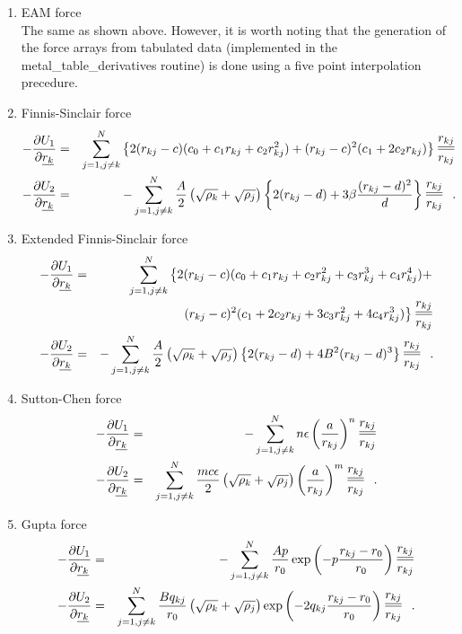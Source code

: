 \begin{enumerate}
\item EAM force \\
The same as shown above.  However, it is worth noting that the
generation of the force arrays from tabulated data (implemented
in the {\sc metal\_table\_derivatives} routine) is done using a
five point interpolation precedure.
\item Finnis-Sinclair force
\begin{eqnarray}
-\frac{\partial U_{1}}{\partial \mbox{$\underline{r_{k}}$}} &=& \sum_{j=1,j \ne k}^{N} \left\{
2 (r_{kj}-c) (c_{0}+c_{1}r_{kj}+c_{2}r_{kj}^{2}) +
(r_{kj}-c)^{2} (c_{1}+2c_{2}r_{kj}) \right\} \frac{\mbox{$\underline{r_{kj}}$}}{r_{kj}} \nonumber \\
-\frac{\partial U_{2}}{\partial \mbox{$\underline{r_{k}}$}} &=& -\sum_{j=1,j \ne k}^{N}
{A \over 2} \left( \sqrt{\rho_{k}} + \sqrt{\rho_{j}} \right)
\left\{ 2(r_{kj}-d) + 3 \beta \frac{(r_{kj}-d)^{2}}{d} \right\} \frac{\mbox{$\underline{r_{kj}}$}}{r_{kj}}~~.
\end{eqnarray}
\item Extended Finnis-Sinclair force
\begin{eqnarray}
-\frac{\partial U_{1}}{\partial \mbox{$\underline{r_{k}}$}} &=& \sum_{j=1,j \ne k}^{N} \left\{
2 (r_{kj}-c) (c_{0}+c_{1}r_{kj}+c_{2}r_{kj}^{2}+c_{3}r_{kj}^{3}+c_{4}r_{kj}^{4}) + \right. \nonumber \\
& & \phantom{xxxxxxx} \left. (r_{kj}-c)^{2} (c_{1}+2c_{2}r_{kj}+3c_{3}r_{kj}^{2}+4c_{4}r_{kj}^{3}) \right\}
\frac{\mbox{$\underline{r_{kj}}$}}{r_{kj}} \\
-\frac{\partial U_{2}}{\partial \mbox{$\underline{r_{k}}$}} &=& -\sum_{j=1,j \ne k}^{N}
{A \over 2} \left( \sqrt{\rho_{k}} + \sqrt{\rho_{j}} \right)
\left\{ 2(r_{kj}-d) + 4 B^{2} (r_{kj}-d)^{3}\right\} \frac{\mbox{$\underline{r_{kj}}$}}{r_{kj}}~~. \nonumber
\end{eqnarray}
\item Sutton-Chen force
\begin{eqnarray}
-\frac{\partial U_{1}}{\partial \mbox{$\underline{r_{k}}$}} &=& -\sum_{j=1,j \ne k}^{N} n \epsilon
\left( \frac{a}{r_{kj}} \right)^{n} \frac{\mbox{$\underline{r_{kj}}$}}{r_{kj}} \nonumber \\
-\frac{\partial U_{2}}{\partial \mbox{$\underline{r_{k}}$}} &=& \sum_{j=1,j \ne k}^{N} \frac{m c \epsilon}{2}
\left( \sqrt{\rho_{k}} + \sqrt{\rho_{j}} \right)
\left( \frac{a}{r_{kj}} \right)^{m} \frac{\mbox{$\underline{r_{kj}}$}}{r_{kj}}~~.
\end{eqnarray}
\item Gupta force
\begin{eqnarray}
-\frac{\partial U_{1}}{\partial \mbox{$\underline{r_{k}}$}} &=& -\sum_{j=1,j \ne k}^{N} \frac{A p}{r_{0}}
\exp \left( -p \frac{r_{kj}-r_{0}}{r_{0}} \right) \frac{\mbox{$\underline{r_{kj}}$}}{r_{kj}} \nonumber \\
-\frac{\partial U_{2}}{\partial \mbox{$\underline{r_{k}}$}} &=& \sum_{j=1,j \ne k}^{N} \frac{B q_{kj}}{r_{0}}
\left( \sqrt{\rho_{k}} + \sqrt{\rho_{j}} \right)
\exp \left( -2 q_{kj} \frac{r_{kj}-r_{0}}{r_{0}} \right) \frac{\mbox{$\underline{r_{kj}}$}}{r_{kj}}~~.
\end{eqnarray}
\end{enumerate}


